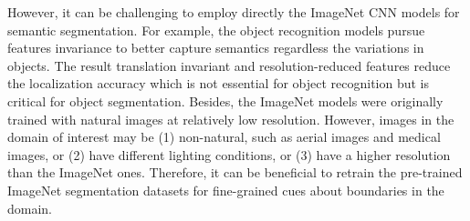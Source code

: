 However, it can be challenging to employ directly the ImageNet CNN models for semantic segmentation.
For example, the object recognition models pursue features invariance to better capture semantics regardless the variations in objects.
The result translation invariant and resolution-reduced features reduce the localization accuracy which is not essential for object recognition but is critical for object segmentation. \cite{zheng2015conditional,chen2016deeplab}
Besides, the ImageNet models were originally trained with natural images at relatively low resolution.
However, images in the domain of interest may be (1) non-natural, such as aerial images and medical images, or (2) have different lighting conditions, or (3) have a higher resolution than the ImageNet ones.
Therefore, it can be beneficial to retrain the pre-trained ImageNet segmentation datasets for fine-grained cues about boundaries in the domain.






